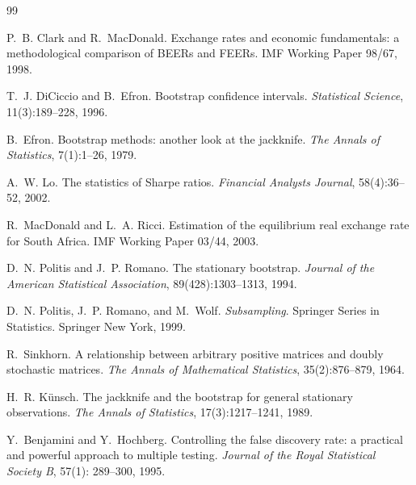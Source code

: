 \documentclass[11pt,a4paper]{article}
\theoremstyle{definition}
\begin{document}
\begin{thebibliography}{99}

P.~B. Clark and R.~MacDonald.
\newblock Exchange rates and economic fundamentals: a methodological
comparison of BEERs and FEERs.
\newblock IMF Working Paper 98/67, 1998.

T.~J. DiCiccio and B.~Efron.
\newblock Bootstrap confidence intervals.
\newblock \emph{Statistical Science}, 11(3):189--228, 1996.

B.~Efron.
\newblock Bootstrap methods: another look at the jackknife.
\newblock \emph{The Annals of Statistics}, 7(1):1--26, 1979.

A.~W. Lo.
\newblock The statistics of Sharpe ratios.
\newblock \emph{Financial Analysts Journal}, 58(4):36--52, 2002.

R.~MacDonald and L.~A. Ricci.
\newblock Estimation of the equilibrium real exchange rate for South
Africa.
\newblock IMF Working Paper 03/44, 2003.

D.~N. Politis and J.~P. Romano.
\newblock The stationary bootstrap.
\newblock \emph{Journal of the American Statistical Association},
  89(428):1303--1313, 1994.

D.~N. Politis, J.~P. Romano, and M.~Wolf.
\newblock \emph{Subsampling}. Springer Series in Statistics.
\newblock Springer New York, 1999.

R.~Sinkhorn.
\newblock A relationship between arbitrary positive matrices and
  doubly stochastic matrices.
\newblock \emph{The Annals of Mathematical Statistics}, 35(2):876--879,
  1964.

H.~R. K{\"u}nsch.
\newblock The jackknife and the bootstrap for general stationary
  observations.
\newblock \emph{The Annals of Statistics}, 17(3):1217--1241, 1989.

Y.~Benjamini and Y.~Hochberg.
\newblock Controlling the false discovery rate: a practical and
  powerful approach to multiple testing.
\newblock \emph{Journal of the Royal Statistical Society B}, 57(1):
  289--300, 1995.

\end{thebibliography}
\end{document}
